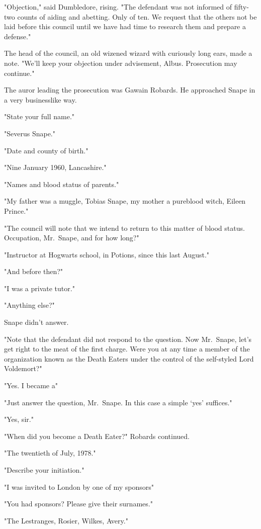 "Objection," said Dumbledore, rising. "The defendant was not informed of fifty-two counts of aiding and abetting. Only of ten. We request that the others not be laid before this council until we have had time to research them and prepare a defense."

The head of the council, an old wizened wizard with curiously long ears, made a note. "We'll keep your objection under advisement, Albus. Prosecution may continue."

The auror leading the prosecution was Gawain Robards. He approached Snape in a very businesslike way.

"State your full name."

"Severus Snape."

"Date and county of birth."

"Nine January 1960, Lancashire."

"Names and blood status of parents."

"My father was a muggle, Tobias Snape, my mother a pureblood witch, Eileen Prince."

"The council will note that we intend to return to this matter of blood status. Occupation, Mr.~Snape, and for how long?"

"Instructor at Hogwarts school, in Potions, since this last August."

"And before then?"

"I was a private tutor."

"Anything else?"

Snape didn't answer.

"Note that the defendant did not respond to the question. Now Mr.~Snape, let's get right to the meat of the first charge. Were you at any time a member of the organization known as the Death Eaters under the control of the self-styled Lord Voldemort?"

"Yes. I became a{\el}"

"Just answer the question, Mr.~Snape. In this case a simple `yes' suffices."

"Yes, sir."

"When did you become a Death Eater?" Robards continued.

"The twentieth of July, 1978."

"Describe your initiation."

"I was invited to London by one of my sponsors{\el}"

"You had sponsors? Please give their surnames."

"The Lestranges, Rosier, Wilkes, Avery."

